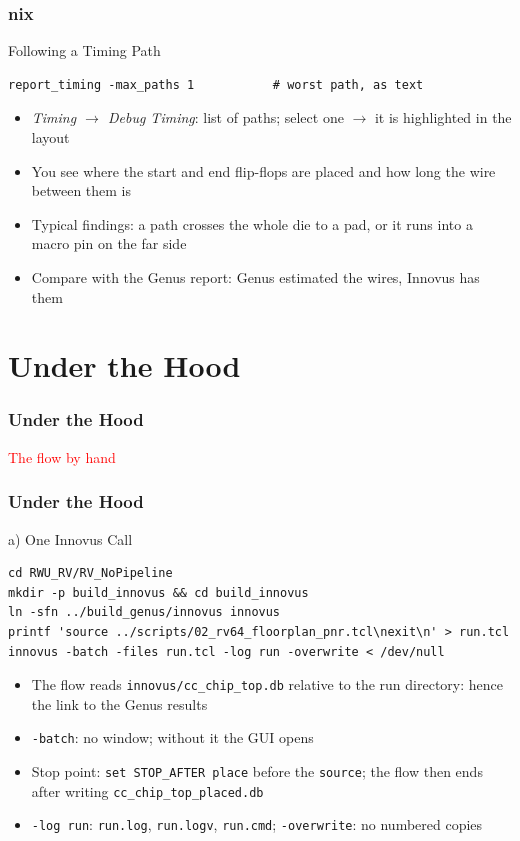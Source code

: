 \documentclass{beamer}
\newcommand{\astitle}{nix}
\newcommand{\assubtitle}{nix}
\newcommand{\cmd}[1]{\texttt{#1}}
\begin{document}
\renewcommand{\assubtitle}{Following a Timing Path}
\begin{frame}[fragile]
\frametitle{\astitle}
\begin{block}{\assubtitle}
  \footnotesize
\begin{lstlisting}[style=sh]
report_timing -max_paths 1           # worst path, as text
\end{lstlisting}
  \begin{itemize}
    \item \emph{Timing $\rightarrow$ Debug Timing}: list of paths;
      select one $\rightarrow$ it is highlighted in the layout
    \item You see where the start and end flip-flops are placed and how
      long the wire between them is
    \item Typical findings: a path crosses the whole die to a pad,
      or it runs into a macro pin on the far side
    \item Compare with the Genus report: Genus estimated the wires,
      Innovus has them
  \end{itemize}
\end{block}
\end{frame}

\section{Under the Hood}
\renewcommand{\astitle}{Under the Hood}
\begin{frame}
\frametitle{\astitle}
\textcolor{red}{The flow by hand}
\end{frame}

\renewcommand{\assubtitle}{a) One Innovus Call}
\begin{frame}[fragile]
\frametitle{\astitle}
\begin{block}{\assubtitle}
  \footnotesize
\begin{lstlisting}[style=sh]
cd RWU_RV/RV_NoPipeline
mkdir -p build_innovus && cd build_innovus
ln -sfn ../build_genus/innovus innovus
printf 'source ../scripts/02_rv64_floorplan_pnr.tcl\nexit\n' > run.tcl
innovus -batch -files run.tcl -log run -overwrite < /dev/null
\end{lstlisting}
  \begin{itemize}
    \item The flow reads \cmd{innovus/cc\_chip\_top.db} relative to the run
      directory: hence the link to the Genus results
    \item \cmd{-batch}: no window; without it the GUI opens
    \item Stop point: \cmd{set STOP\_AFTER place} before the \cmd{source};
      the flow then ends after writing \cmd{cc\_chip\_top\_placed.db}
    \item \cmd{-log run}: \cmd{run.log}, \cmd{run.logv}, \cmd{run.cmd};
      \cmd{-overwrite}: no numbered copies
  \end{itemize}
\end{block}
\end{frame}
\end{document}
